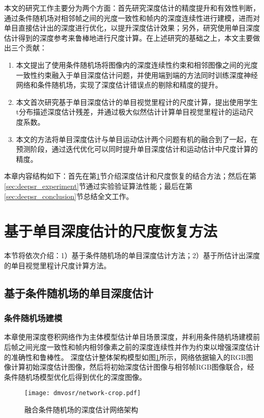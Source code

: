 本文的研究工作主要分为两个方面：首先研究深度估计的精度提升和有效性判断，通过条件随机场对相邻帧之间的光度一致性和帧内的深度连续性进行建模，进而对单目直接估计出的深度进行优化，以提升深度估计效果；另外，研究使用单目深度估计得到的深度参考来鲁棒地进行尺度计算。在上述研究的基础之上，本文主要做出三个贡献：
\begin{enumerate}
    \item 本文提出了使用条件随机场将图像内的深度连续性约束和相邻图像之间的光度一致性约束融入于单目深度估计问题，并使用端到端的方法同时训练深度神经网络和条件随机场，实现了深度估计错误点的剔除和精度的提升。
    \item 本文首次研究基于单目深度估计的单目视觉里程计的尺度计算，提出使用学生t分布描述深度估计残差，并通过极大似然估计计算单目视觉里程计的运动尺度系数。
    \item 本文的方法将单目深度估计与单目运动估计两个问题有机的融合到了一起，在预测阶段，通过迭代优化可以同时提升单目深度估计和运动估计中尺度计算的精度。
\end{enumerate}

本章内容结构如下：首先在第\ref{sec:deepsr_method}节介绍深度估计和尺度恢复的结合方法；然后在第\ref{sec:deepsr_experiment}节通过实验验证算法性能；最后在第
\ref{sec:deepsr_conclusion}节总结全文工作。

\section{基于单目深度估计的尺度恢复方法}
\label{sec:deepsr_method}
本节将依次介绍：1）基于条件随机场的单目深度估计方法；2）基于所估计出深度的单目视觉里程计尺度计算方法。

\subsection{基于条件随机场的单目深度估计}
\subsubsection{条件随机场建模}
本章使用深度卷积网络作为主体模型估计单目场景深度，并利用条件随机场建模前后帧之间光度一致性和帧内相邻像素之前的深度连续性并作为约束以增强深度估计的准确性和鲁棒性。
深度估计整体架构模型如图\ref{fig:deepsr_network_structure}所示，网络依据输入的RGB图像计算初始深度估计图像，然后将初始深度估计图像与相邻帧RGB图像联合，经条件随机场模型优化后得到优化的深度图像。
\begin{figure}
    \centering
    \texttt{[image: dmvosr/network-crop.pdf]}
    \caption{融合条件随机场的深度估计网络架构}
    \label{fig:deepsr_network_structure}
\end{figure}

